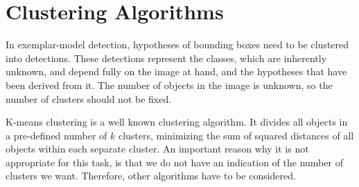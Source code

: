 
\section{Clustering Algorithms} %
\label{sub:clustering_algorithms}

In exemplar-model detection, hypotheses of bounding boxes need to be clustered into detections. These detections represent the classes, which are inherently unknown, and depend fully on the image at hand, and the hypotheses that have been derived from it. The number of objects in the image is unknown, so the number of clusters should not be fixed.

K-means clustering is a well known clustering algorithm. It divides all objects in a pre-defined number of $k$ clusters, minimizing the sum of squared distances of all objects within each separate cluster. An important reason why it is not appropriate for this task, is that we do not have an indication of the number of clusters we want. Therefore, other algorithms have to be considered.

